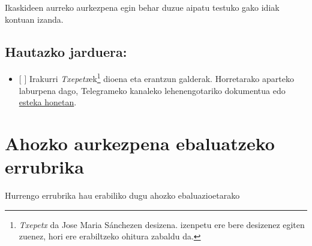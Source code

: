 \documentclass[]{book}
\providecommand{\tightlist}{%
  \setlength{\itemsep}{0pt}\setlength{\parskip}{0pt}}
\let\rmarkdownfootnote\footnote%
\def\footnote{\protect\rmarkdownfootnote}
\begin{document}
Ikaskideen aurreko aurkezpena egin behar duzue aipatu testuko gako idiak kontuan izanda.

\hypertarget{hautazko-jarduera}{%
\section{Hautazko jarduera:}\label{hautazko-jarduera}}

\begin{itemize}
\tightlist
\item
  {[} {]} Irakurri \emph{Txepetx}ek\footnote{\emph{Txepetx} da Jose Maria Sánchezen desizena. izenpetu ere bere desizenez egiten zuenez, hori ere erabiltzeko ohitura zabaldu da.} dioena eta erantzun galderak. Horretarako aparteko laburpena dago, Telegrameko kanaleko lehenengotariko dokumentua edo \href{https://github.com/JuanAbasolo/HD/blob/01-gaia/1_Txepetx_testuak.pdf}{esteka honetan}.
\end{itemize}

\hypertarget{ahozko-aurkezpena-ebaluatzeko-errubrika}{%
\chapter*{Ahozko aurkezpena ebaluatzeko errubrika}\label{ahozko-aurkezpena-ebaluatzeko-errubrika}}

Hurrengo errubrika hau erabiliko dugu ahozko ebaluazioetarako
\end{document}
